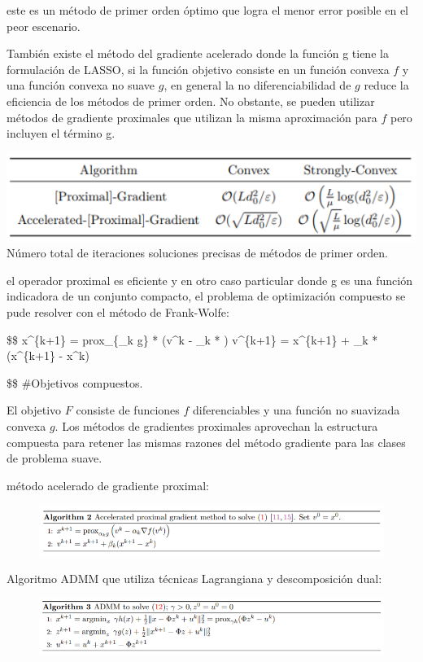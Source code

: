\documentclass[]{article}
\begin{document}
este es un método de primer orden óptimo que logra el menor error
posible en el peor escenario.

También existe el método del gradiente acelerado donde la función g
tiene la formulación de LASSO, si la función objetivo consiste en un
función convexa \(f\) y una función convexa no suave \(g\), en general
la no diferenciabilidad de \(g\) reduce la eficiencia de los métodos de
primer orden. No obstante, se pueden utilizar métodos de gradiente
proximales que utilizan la misma aproximación para \(f\) pero incluyen
el término g.

\includegraphics{acelerado.png} Número total de iteraciones soluciones
precisas de métodos de primer orden.

el operador proximal es eficiente y en otro caso particular donde g es
una función indicadora de un conjunto compacto, el problema de
optimización compuesto se pude resolver con el método de Frank-Wolfe:

\$\$ x\^{}\{k+1\} = prox\_\{\alpha\_k g\} * (v\^{}k - \alpha\_k *
) v\^{}\{k+1\} = x\^{}\{k+1\} + \beta\_k * (x\^{}\{k+1\} -
x\^{}k)

\$\$ \#Objetivos compuestos.

El objetivo \(F\) consiste de funciones \(f\) diferenciables y una
función no suavizada convexa \(g\). Los métodos de gradientes proximales
aprovechan la estructura compuesta para retener las mismas razones del
método gradiente para las clases de problema suave.

método acelerado de gradiente proximal:

\begin{figure}
\centering
\includegraphics{prox.png}
\caption{}
\end{figure}

Algoritmo ADMM que utiliza técnicas Lagrangiana y descomposición dual:

\begin{figure}
\centering
\includegraphics{admm.png}
\caption{}
\end{figure}
\end{document}
